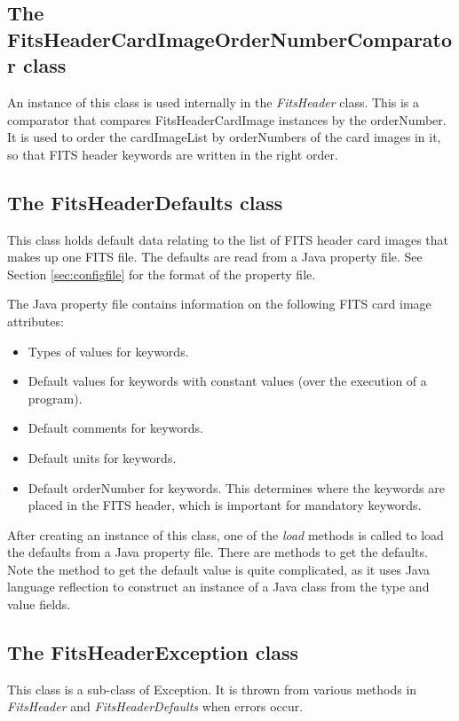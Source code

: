 \documentclass[10pt,a4paper]{article}
\begin{document}
\subsection{The FitsHeaderCardImageOrderNumberComparator class}
An instance of this class is used internally in the {\em FitsHeader} class. This is a comparator that
compares FitsHeaderCardImage instances by the orderNumber. It is used to
order the cardImageList by orderNumbers of the card images in it, so that
FITS header keywords are written in the right order.

\subsection{The FitsHeaderDefaults class}
\label{sec:fitsheaderdefaultsclass}
This class holds default data relating to the list of FITS header card images that makes up one FITS file. 
The defaults are read from a Java property file. See Section \ref{sec:configfile} for the format of the 
property file. 

The Java property file contains information on the following FITS card image attributes: 
\begin{itemize}
\item Types of values for keywords. 
\item Default values for keywords with constant values (over the execution of a program). 
\item Default comments for keywords. 
\item Default units for keywords. 
\item Default orderNumber for keywords. This determines where the keywords are placed in the FITS header, 
	which is important for mandatory keywords. 
\end{itemize}

After creating an instance of this class, one of the {\em load} methods is called to load the defaults from a 
Java property file. 
There are methods to get the defaults. Note the method to get the default value is quite complicated, as it
uses Java language reflection to construct an instance of a Java class from the type and value fields.

\subsection{The FitsHeaderException class}
This class is a sub-class of Exception. It is thrown from various methods in {\em FitsHeader} and
{\em FitsHeaderDefaults} when errors occur.
\end{document}
